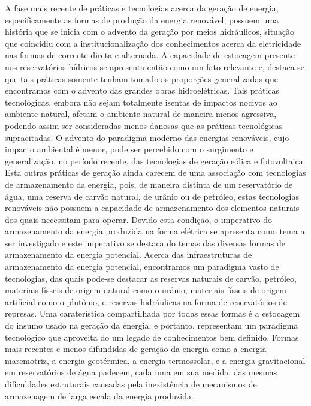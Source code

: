 \documentclass[
   article,       %
   12pt,          %
   oneside,       %
   a4paper,       %
   english,       %
   brazil,           %
   sumario=tradicional
   ]{abntex2}
\begin{document}
A fase mais recente de práticas e tecnologias acerca da geração de energia, especificamente as formas de produção da energia renovável, possuem uma história que se inicia com o advento da geração por meios hidráulicos, situação que coincidiu com a institucionalização dos conhecimentos acerca da eletricidade nas formas de corrente direta e alternada. A capacidade de estocagem presente nos reservatórios hídricos se apresenta então como um fato relevante e, destaca-se que tais práticas somente tenham tomado as proporções generalizadas que encontramos com o advento das grandes obras hidroelétricas. Tais práticas tecnológicas, embora não sejam totalmente isentas de impactos nocivos ao ambiente natural, afetam o ambiente natural de maneira menos agressiva, podendo assim ser consideradas menos danosas que as práticas tecnológicas supracitadas. O advento do paradigma moderno das energias renováveis, cujo impacto ambiental é menor, pode ser percebido com o surgimento e generalização, no período recente, das tecnologias de geração eólica e fotovoltaica. Esta outras práticas de geração ainda carecem de uma associação com tecnologias de armazenamento da energia, pois, de maneira distinta de um reservatório de água, uma reserva de carvão natural, de urânio ou de petróleo, estas tecnologias renováveis não possuem a capacidade de armazenamento dos elementos naturais dos quais necessitam para operar. Devido esta condição, o imperativo do armazenamento da energia produzida na forma elétrica se apresenta como tema a ser investigado e este imperativo se destaca do temas das diversas formas de armazenamento da energia potencial. Acerca das infraestruturas de armazenamento da energia potencial, encontramos um paradigma vasto de tecnologias, das quais pode-se destacar as reservas naturais de carvão, petróleo, materiais físseis de origem natural como o urânio, materiais físseis de origem artificial como o plutônio, e reservas hidráulicas na forma de reservatórios de represas. Uma caraterística compartilhada por todas essas formas é a estocagem do insumo usado na geração da energia, e portanto, representam um paradigma tecnológico que aproveita do um legado de conhecimentos bem definido. Formas mais recentes e menos difundidas de geração da energia como a energia maremotriz, a energia geotérmica, a energia termossolar, e a energia gravitacional em reservatórios de água padecem, cada uma em sua medida, das mesmas dificuldades estruturais causadas pela inexistência de mecanismos de armazenagem de larga escala da energia produzida.
\end{document}
